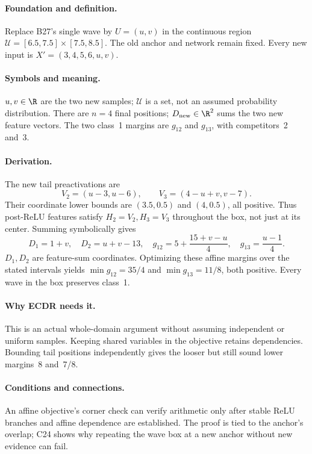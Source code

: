 \paragraph{Foundation and definition.}
Replace B27's single wave by $U=(u,v)$ in the continuous region
$\mathcal U=[6.5,7.5]\times[7.5,8.5]$. The old anchor and network remain
fixed. Every new input is $X'=(3,4,5,6,u,v)$.
\paragraph{Symbols and meaning.}
$u,v\in\R$ are the two new samples; $\mathcal U$ is a set, not an
assumed probability distribution. There are $n=4$ final positions;
$D_{\rm new}\in\R^2$ sums the two new feature vectors.
The two class~1 margins are $g_{12}$ and $g_{13}$, with competitors~2 and~3.
\paragraph{Derivation.}
The new tail preactivations are
\[
 V_2=(u-3,u-6),\qquad V_3=(4-u+v,v-7).
\]
Their coordinate lower bounds are $(3.5,0.5)$ and $(4,0.5)$, all positive.
Thus post-ReLU features satisfy $H_2=V_2,H_3=V_3$ throughout the box,
not just at its center.
Summing symbolically gives
\[
 D_1=1+v,\quad D_2=u+v-13,\quad
 g_{12}=5+\frac{15+v-u}{4},\quad g_{13}=\frac{u-1}{4}.
\]
$D_1,D_2$ are feature-sum coordinates. Optimizing these affine margins
over the stated intervals yields $\min g_{12}=35/4$ and
$\min g_{13}=11/8$, both positive. Every wave in the box preserves class~1.
\paragraph{Why ECDR needs it.}
This is an actual whole-domain argument without assuming independent or
uniform samples. Keeping shared variables in the objective retains
dependencies. Bounding tail positions independently gives the looser but
still sound lower margins~8 and~7/8.
\paragraph{Conditions and connections.}
An affine objective's corner check can verify arithmetic only after stable
ReLU branches and affine dependence are established. The proof is tied to
the anchor's overlap; C24 shows why repeating the wave box at a new anchor
without new evidence can fail.

